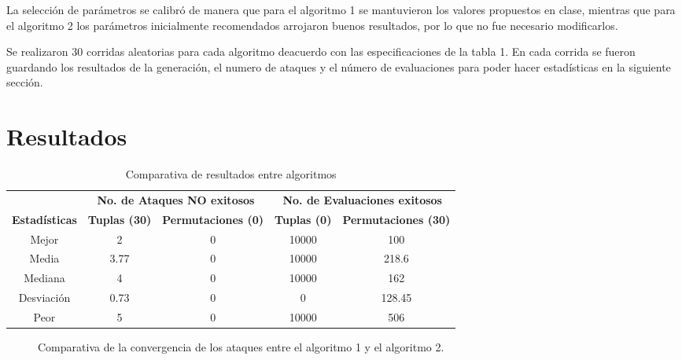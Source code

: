 \documentclass[runningheads]{llncs}
\begin{document}
La selección de parámetros se calibró de manera que para el algoritmo 1 se mantuvieron los valores propuestos en clase, mientras que para el algoritmo 2 los parámetros inicialmente recomendados arrojaron buenos resultados, por lo que no fue necesario modificarlos.

Se realizaron 30 corridas aleatorias para cada algoritmo deacuerdo con las especificaciones de la tabla 1. En cada corrida se fueron guardando los resultados de la generación, el numero de ataques y el número de evaluaciones para poder hacer estadísticas en la siguiente sección.

\section{Resultados}

\vspace{-10pt}  %


\begin{table}[htbp]
	\centering
	\caption{Comparativa de resultados entre algoritmos}
	\begin{tabular}{|c|cc|cc|}
		\hline
		& \multicolumn{2}{c|}{\textbf{No. de Ataques NO exitosos }} & \multicolumn{2}{c|}{\textbf{No. de Evaluaciones exitosos }} \\
		\cline{2-5}
		\textbf{Estadísticas} & \textbf{Tuplas (30)} & \textbf{Permutaciones (0)} & \textbf{Tuplas (0)} & \textbf{Permutaciones (30)} \\
		\hline
		Mejor & 2 & 0 & 10000 & 100 \\
		Media & 3.77 & 0 & 10000 & 218.6 \\
		Mediana & 4 & 0 & 10000 & 162 \\
		Desviación & 0.73 & 0 & 0 & 128.45 \\
		Peor & 5 & 0 & 10000 & 506 \\
		\hline
	\end{tabular}
	\label{tab:comparativa_algoritmos}
\end{table}

\vspace{-30pt}  %


\begin{figure}[htbp]
	\centering
	\hfill
	\caption{Comparativa de la convergencia de los ataques entre el algoritmo 1 y el algoritmo 2.}
	\label{fig:modelos}
\end{figure}
\end{document}
